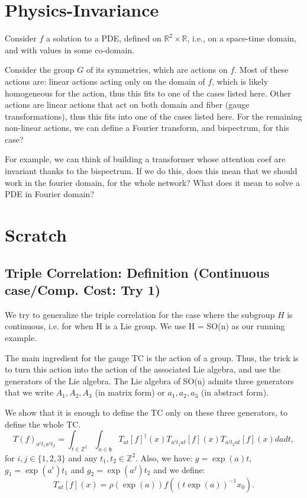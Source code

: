 \documentclass{article}
\begin{document}
\section{Physics-Invariance}
Consider $f$ a solution to a PDE, defined on $\mathbb{R}^2 \times \mathbb{R}$, i.e., on a space-time domain, and with values in some co-domain.

Consider the group $G$ of its symmetries, which are actions on $f$. Most of these actions are: linear actions acting only on the domain of $f$, which is likely homogeneous for the action, thus this fits to one of the cases listed here. Other actions are linear actions that act on both domain and fiber (gauge transformations), thus this fits into one of the cases listed here. For the remaining non-linear actions, we can define a Fourier transform, and bispectrum, for this case?

For example, we can think of building a transformer whose attention coef are invariant thanks to the bispectrum. If we do this, does this mean that we should work in the fourier domain, for the  whole network? What does it mean to solve a PDE in Fourier domain?

\section{Scratch}

\subsection{Triple Correlation: Definition (Continuous case/Comp. Cost: Try 1)}

We try to generalize the triple correlation for the case where the subgroup $H$ is continuous, i.e. for when H is a Lie group. We use H = SO(n) as our running example.

The main ingredient for the gauge TC is the action of a group. Thus, the trick is to turn this action into the action of the associated Lie algebra, and use the generators of the Lie algebra. The Lie algebra of SO(n) admits three generators that we write $A_1, A_2, A_3$ (in matrix form) or $a_1, a_2, a_3$ (in abstract form).

We show that it is enough to define the TC only on these three generators, to define the whole TC.
\begin{equation}
    T(f)_{a^it_1a^jt_2}
        = \int_{t \in \mathbb{Z}^2}
            \int_{a \in \mathfrak{h}}
                T_{at}[f]^\dagger (x) T_{a^it_1at}[f](x) T_{a^jt_2at}[f](x)
                    dadt,
\end{equation}
for $i, j \in \{1, 2, 3\}$ and any $t_1, t_2 \in \mathbb{Z}^2$. Also, we have: $g = \exp(a)t$, $g_1 = \exp(a^i)t_1$ and $g_2 = \exp(a^j) t_2$ and we define:
\begin{equation}
    T_{at}[f](x) = \rho(\exp(a))f((t\exp(a))^{-1}x_0).
\end{equation}
\end{document}
